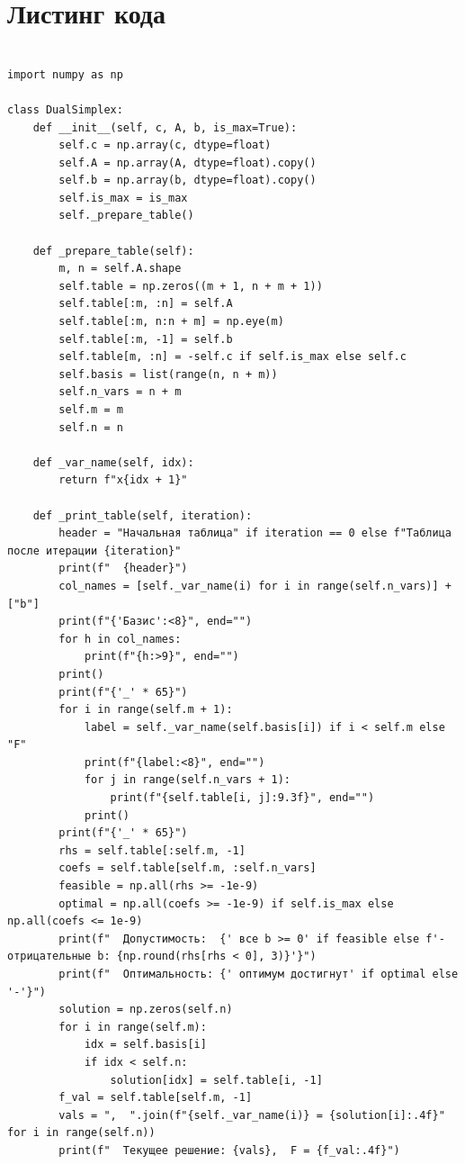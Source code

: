 \documentclass[oneside,a4paper,14pt]{extarticle}
\begin{document}
\newpage
\section*{Листинг кода}

\begin{verbatim}

import numpy as np

class DualSimplex:
    def __init__(self, c, A, b, is_max=True):
        self.c = np.array(c, dtype=float)
        self.A = np.array(A, dtype=float).copy()
        self.b = np.array(b, dtype=float).copy()
        self.is_max = is_max
        self._prepare_table()

    def _prepare_table(self):
        m, n = self.A.shape
        self.table = np.zeros((m + 1, n + m + 1))
        self.table[:m, :n] = self.A
        self.table[:m, n:n + m] = np.eye(m)
        self.table[:m, -1] = self.b
        self.table[m, :n] = -self.c if self.is_max else self.c
        self.basis = list(range(n, n + m))
        self.n_vars = n + m
        self.m = m
        self.n = n

    def _var_name(self, idx):
        return f"x{idx + 1}"

    def _print_table(self, iteration):
        header = "Начальная таблица" if iteration == 0 else f"Таблица после итерации {iteration}"
        print(f"  {header}")
        col_names = [self._var_name(i) for i in range(self.n_vars)] + ["b"]
        print(f"{'Базис':<8}", end="")
        for h in col_names:
            print(f"{h:>9}", end="")
        print()
        print(f"{'_' * 65}")
        for i in range(self.m + 1):
            label = self._var_name(self.basis[i]) if i < self.m else "F"
            print(f"{label:<8}", end="")
            for j in range(self.n_vars + 1):
                print(f"{self.table[i, j]:9.3f}", end="")
            print()
        print(f"{'_' * 65}")
        rhs = self.table[:self.m, -1]
        coefs = self.table[self.m, :self.n_vars]
        feasible = np.all(rhs >= -1e-9)
        optimal = np.all(coefs >= -1e-9) if self.is_max else np.all(coefs <= 1e-9)
        print(f"  Допустимость:  {' все b >= 0' if feasible else f'- отрицательные b: {np.round(rhs[rhs < 0], 3)}'}")
        print(f"  Оптимальность: {' оптимум достигнут' if optimal else '-'}")
        solution = np.zeros(self.n)
        for i in range(self.m):
            idx = self.basis[i]
            if idx < self.n:
                solution[idx] = self.table[i, -1]
        f_val = self.table[self.m, -1]
        vals = ",  ".join(f"{self._var_name(i)} = {solution[i]:.4f}" for i in range(self.n))
        print(f"  Текущее решение: {vals},  F = {f_val:.4f}")


\end{verbatim}
\end{document}
